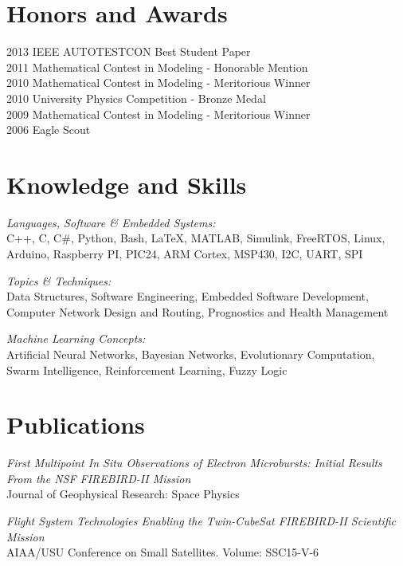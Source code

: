 \documentclass[line,margin]{res}
\begin{document}
\begin{resume}
\clearpage

\section{Honors and Awards}           
			2013 IEEE AUTOTESTCON Best Student Paper \\  
			2011 Mathematical Contest in Modeling - Honorable Mention \\
            2010 Mathematical Contest in Modeling - Meritorious Winner \\
            2010 University Physics Competition - Bronze Medal \\
			2009 Mathematical Contest in Modeling - Meritorious Winner \\
            2006 Eagle Scout
            
\section{Knowledge and Skills} {\sl Languages, Software \& Embedded Systems:}\\
				C++, C, C\#, Python, Bash, \LaTeX, MATLAB, Simulink, FreeRTOS, Linux, Arduino, Raspberry PI, PIC24, ARM Cortex, MSP430, I2C, UART, SPI
                
                {\sl Topics \& Techniques:}\\Data Structures, Software Engineering, Embedded Software Development, Computer Network Design and Routing, Prognostics and Health Management
                
                {\sl Machine Learning Concepts:}\\Artificial Neural Networks, Bayesian Networks, Evolutionary Computation, Swarm Intelligence, Reinforcement Learning, Fuzzy Logic
			
\section{Publications} 
{\sl First Multipoint In Situ Observations of Electron Microbursts: Initial Results From the NSF FIREBIRD-II Mission}\\
Journal of Geophysical Research: Space Physics

{\sl Flight System Technologies Enabling the Twin-CubeSat FIREBIRD-II Scientific Mission}\\
AIAA/USU Conference on Small Satellites. Volume: SSC15-V-6 


\end{resume}
\end{document}

